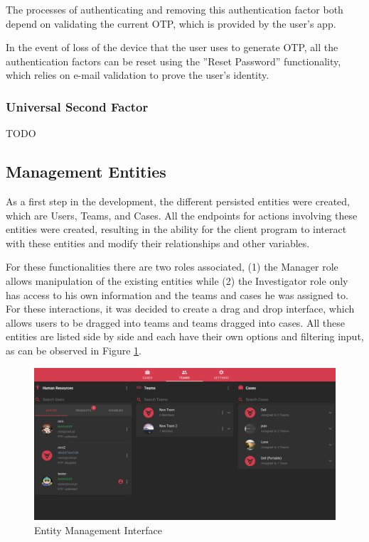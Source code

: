 The processes of authenticating and removing this authentication factor both depend on validating the current OTP, which is provided by the user's app.

In the event of loss of the device that the user uses to generate OTP, all the authentication factors can be reset using the ''Reset Password'' functionality, which relies on e-mail validation to prove the user's identity.

\subsubsection*{Universal Second Factor}

TODO

\subsection{Management Entities}

As a first step in the development, the different persisted entities were created, which are Users, Teams, and Cases. All the endpoints for actions involving these 
entities were created, resulting in the ability for the client program to interact with these entities and modify their relationships and other variables.

For these functionalities there are two roles associated, (1) the Manager role allows manipulation of the existing entities while (2) the Investigator role only has access to his
own information and the teams and cases he was assigned to. For these interactions, it was decided to create a drag and drop interface, which allows users to be dragged into
teams and teams dragged into cases. All these entities are listed side by side and each have their own options and filtering input, as can be observed in Figure \ref{fig:users}.

\begin{figure}[ht]
 \centering
 \includegraphics[width=1\linewidth]{imgs/users.png}
 \caption{Entity Management Interface}
 \label{fig:users}
\end{figure}

